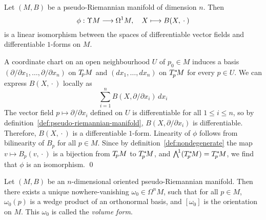 Let $(M, B)$ be a pseudo-Riemannian manifold of dimension $n$.
Then
\[ \phi : \Upsilon M \longrightarrow \Omega^1 M,
   \quad X \longmapsto B(X, {}\cdot{}) \]
is a linear isomorphism between the spaces of differentiable vector fields
and differentiable $1$-forms on $M$.

\proof
A coordinate chart on an open neighbourhood $U$ of $p_0 \in M$
induces a basis $(\partial / \partial x_1, \ldots, \partial / \partial x_n)$ on $T_{\!p} M$
and $(dx_1, \ldots, dx_n)$ on $T^*_{\hspace{-0.1em}p}\! M$ for every $p \in U$.
We can express $B(X, {}\cdot{})$ locally as
\[ \sum_{i = 1}^n B(X, \partial / \partial x_i) \, dx_i \]
The vector field $p \mapsto \partial / \partial x_i$ defined on $U$ is differentiable for all $1 \leq i \leq n$,
so by definition~\ref{def:pseudo-riemannian-manifold},
$B(X, \partial / \partial x_i)$ is differentiable.
Therefore, $B(X, {}\cdot{})$ is a differentiable $1$-form.
Linearity of $\phi$ follows from bilinearity of $B_p$ for all $p \in M$.
Since by definition~\ref{def:nondegenerate} the map
$v \mapsto B_p(v, {}\cdot{})$ is a bijection from $T_{\!p} M$ to $T^*_{\hspace{-0.1em}p}\! M$,
and ${\textstyle\bigwedge\nolimits^{\!{1}}}(T^*_{\hspace{-0.1em}p}\! M) = T^*_{\hspace{-0.1em}p}\! M$,
we find that $\phi$ is an isomorphism.
\qed

Let $(M, B)$ be an $n$-dimensional oriented pseudo-Riemannian manifold.
Then there exists a unique nowhere-vanishing $\omega_0 \in \Omega^n M$,
such that for all $p \in M$,
$\omega_0(p)$ is a wedge product of an orthonormal basis,
and $[\omega_0]$ is the orientation on $M$.
This $\omega_0$ is called the \emph{volume form}.

